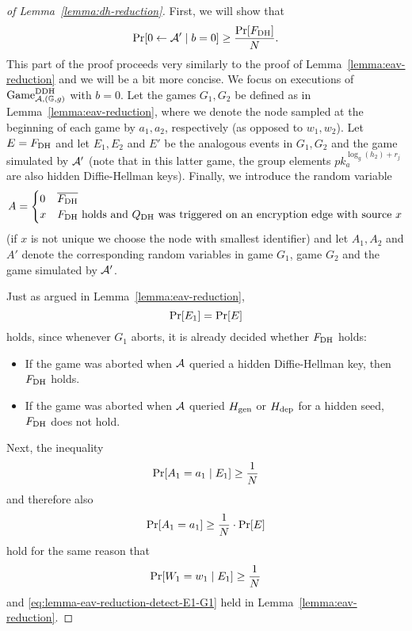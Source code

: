 \begin{proof}[of Lemma~\ref{lemma:dh-reduction}]
	First, we will show that
	\begin{equation} \label{eq:lemma-dh-reduction-b=0}
		\pr{0 \from \adv' \mid b = 0} \ge \frac{\pr{\fdh}}{N}.
	\end{equation}
	This part of the proof proceeds very similarly to the proof of Lemma~\vref{lemma:eav-reduction} and we will be a bit more concise. We focus on executions of $\mathrm{Game}_{\mathcal{A}, (\mathbb{G}, g)}^{\mathrm{DDH}}$ with $b = 0$. Let the games $G_1, G_2$ be defined as in Lemma~\ref{lemma:eav-reduction}, where we denote the node sampled at the beginning of each game by $a_1, a_2$, respectively (as opposed to $w_1, w_2$). Let $E = F_\mathrm{DH}$ and let $E_1, E_2$ and $E'$ be the analogous events in $G_1, G_2$ and the game simulated by $\mathcal{A}'$ (note that in this latter game, the group elements $pk_a^{\log_g(h_2) + r_j}$ are also hidden Diffie-Hellman keys). Finally, we introduce the random variable
	\[
		A = \begin{cases}
			0 & \overline{F_\mathrm{DH}}                                                                    \\
			x & \text{$F_\mathrm{DH}$ holds and $Q_\mathrm{DH}$ was triggered on an encryption edge with source $x$}
		\end{cases}
	\]
	(if $x$ is not unique we choose the node with smallest identifier) and let $A_1, A_2$ and $A'$ denote the corresponding random variables in game $G_1$, game $G_2$ and the game simulated by $\mathcal{A}'$.

	Just as argued in Lemma~\ref{lemma:eav-reduction},
	\begin{equation} \label{eq:lemma-dh-reduction-E=E_1}
		\pr{E_1} = \pr{E}
	\end{equation}
	holds, since whenever $G_1$ aborts, it is already decided whether $F_\mathrm{DH}$ holds:
	\begin{itemize}
		\item If the game was aborted when $\mathcal{A}$ queried a hidden Diffie-Hellman key, then $F_\mathrm{DH}$ holds.
		\item If the game was aborted when $\mathcal{A}$ queried $H_\mathrm{gen}$ or $H_\mathrm{dep}$ for a hidden seed, $F_\mathrm{DH}$ does not hold.
	\end{itemize}

	Next, the inequality
	\[
		\pr{A_1 = a_1 \mid E_1} \ge \frac{1}{N}
	\]
	and therefore also
	\begin{equation} \label{eq:lemma-dh-reduction-detect-E1-G1}
		\pr{A_1 = a_1} \ge \frac{1}{N} \cdot \pr{E}
	\end{equation}
	hold for the same reason that
	\[
		\pr{W_1 = w_1 \mid E_1} \ge \frac{1}{N}
	\]
	and \eqref{eq:lemma-eav-reduction-detect-E1-G1} held in Lemma~\ref{lemma:eav-reduction}.


\end{proof}
